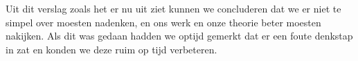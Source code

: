 \documentclass{article}
\begin{document}
Uit dit verslag zoals het er nu uit ziet kunnen we concluderen dat we er niet te simpel over moesten nadenken, en ons werk en onze theorie beter moesten nakijken. Als dit was gedaan hadden we optijd gemerkt dat er een foute denkstap in zat en konden we deze ruim op tijd verbeteren.\\
\end{document}
